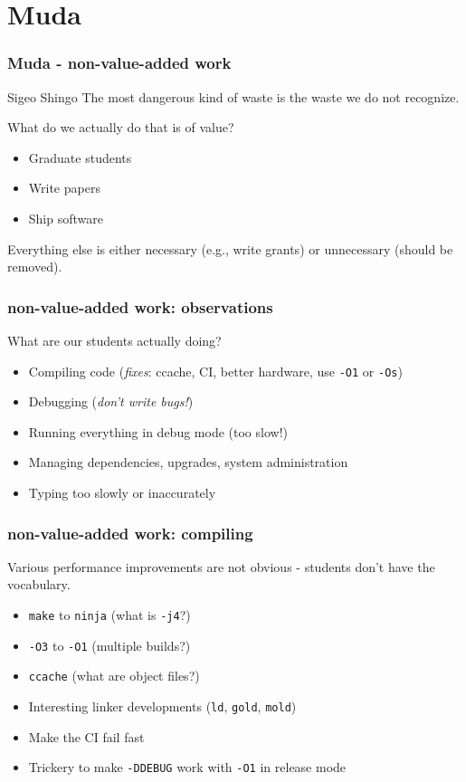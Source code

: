 \documentclass[8pt]{beamer}
\begin{document}
\section{Muda}
\begin{frame}
  \frametitle{Muda - non-value-added work}
  \begin{aquote}{Sigeo Shingo}
    The most dangerous kind of waste is the waste we do not recognize.
  \end{aquote}
  What do we actually do that is of value?

  \vfill

  \begin{itemize}
    \item Graduate students
    \item Write papers
    \item Ship software
  \end{itemize}

  \vfill

  Everything else is either necessary (e.g., write grants) or unnecessary
  (should be removed).
\end{frame}

\begin{frame}
  \frametitle{non-value-added work: observations}

  What are our students actually doing?
  \begin{itemize}
    \item Compiling code (\emph{fixes}: ccache, CI, better hardware, use \texttt{-O1} or \texttt{-Os})
    \item Debugging (\emph{don't write bugs!})
    \item Running everything in debug mode (too slow!)
    \item Managing dependencies, upgrades, system administration
    \item Typing too slowly or inaccurately
  \end{itemize}
\end{frame}

\begin{frame}
  \frametitle{non-value-added work: compiling}

  Various performance improvements are not obvious - students don't have the vocabulary.
  \begin{itemize}
    \item \texttt{make} to \texttt{ninja} (what is \texttt{-j4}?)
    \item \texttt{-O3} to \texttt{-O1} (multiple builds?)
    \item \texttt{ccache} (what are object files?)
    \item Interesting linker developments (\texttt{ld}, \texttt{gold}, \texttt{mold})
    \item Make the CI fail fast
    \item Trickery to make \texttt{-DDEBUG} work with \texttt{-O1} in release mode
  \end{itemize}
\end{frame}
\end{document}
